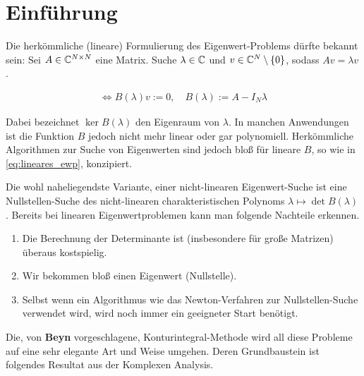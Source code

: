 \section{Einführung}

Die herkömmliche (lineare) Formulierung des Eigenwert-Problems dürfte bekannt sein:
Sei $A \in \mathbb{C}^{N \times N}$ eine Matrix.
Suche $\lambda \in \mathbb{C}$ und $v \in \mathbb{C}^N \setminus {\left \{ 0 \right \}}$, sodass $A v = \lambda v$.

\begin{align} \label{eq:lineares_ewp}
    \iff
    B(\lambda) v := 0,
    \quad
    B(\lambda) := A - I_N \lambda
\end{align}

Dabei bezeichnet $\ker B(\lambda)$ den Eigenraum von $\lambda$.
In manchen Anwendungen ist die Funktion $B$ jedoch nicht mehr linear oder gar polynomiell.
Herkömmliche Algorithmen zur Suche von Eigenwerten sind jedoch bloß für lineare $B$, so wie in \eqref{eq:lineares_ewp}, konzipiert.

Die wohl naheliegendste Variante, einer nicht-linearen Eigenwert-Suche ist eine Nullstellen-Suche des nicht-linearen charakteristischen Polynoms $\lambda \mapsto \det B(\lambda)$.
Bereits bei linearen Eigenwertproblemen kann man folgende Nachteile erkennen.

\begin{enumerate}[label = \arabic*.]
    \item Die Berechnung der Determinante ist (insbesondere für große Matrizen) überaus kostspielig.
    \item Wir bekommen bloß einen Eigenwert (Nullstelle).
    \item Selbst wenn ein Algorithmus wie das Newton-Verfahren zur Nullstellen-Suche verwendet wird, wird noch immer ein geeigneter Start benötigt.
\end{enumerate}

Die, von \textbf{Beyn} vorgeschlagene, Konturintegral-Methode wird all diese Probleme auf eine sehr elegante Art und Weise umgehen.
Deren Grundbaustein ist folgendes Resultat aus der Komplexen Analysis.